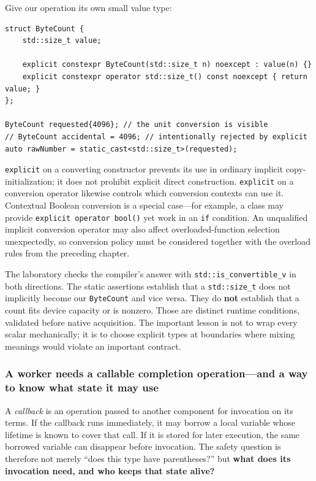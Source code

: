 Give our operation its own small value type:

\begin{verbatim}
struct ByteCount {
    std::size_t value;

    explicit constexpr ByteCount(std::size_t n) noexcept : value(n) {}
    explicit constexpr operator std::size_t() const noexcept { return value; }
};

ByteCount requested{4096}; // the unit conversion is visible
// ByteCount accidental = 4096; // intentionally rejected by explicit
auto rawNumber = static_cast<std::size_t>(requested);
\end{verbatim}

\texttt{explicit} on a converting constructor prevents its use in ordinary implicit copy-initialization; it does not prohibit explicit direct construction. \texttt{explicit} on a conversion operator likewise controls which conversion contexts can use it. Contextual Boolean conversion is a special case---for example, a class may provide \texttt{explicit\ operator\ bool()} yet work in an \texttt{if} condition. An unqualified implicit conversion operator may also affect overloaded-function selection unexpectedly, so conversion policy must be considered together with the overload rules from the preceding chapter.

The laboratory checks the compiler's answer with \texttt{std::is\_convertible\_v} in both directions. The static assertions establish that a \texttt{std::size\_t} does not implicitly become our \texttt{ByteCount} and vice versa. They do \textbf{not} establish that a count fits device capacity or is nonzero. Those are distinct runtime conditions, validated before native acquisition. The important lesson is not to wrap every scalar mechanically; it is to choose explicit types at boundaries where mixing meanings would violate an important contract.

\subsubsection{A worker needs a callable completion operation---and a way to know what state it may use}\label{a-worker-needs-a-callable-completion-operationand-a-way-to-know-what-state-it-may-use}

A \emph{callback} is an operation passed to another component for invocation on its terms. If the callback runs immediately, it may borrow a local variable whose lifetime is known to cover that call. If it is stored for later execution, the same borrowed variable can disappear before invocation. The safety question is therefore not merely ``does this type have parentheses?'' but \textbf{what does its invocation need, and who keeps that state alive?}

